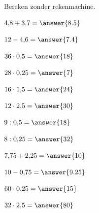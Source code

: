 \documentclass{ximera}
\begin{document}
\begin{oefening}{\oefB\ESS}

Bereken zonder rekenmachine.

\begin{question} \(4{,}8+3{,}7=\answer{8.5}\) \end{question}

\begin{question} \(12-4{,}6=\answer{7.4}\) \end{question}

\begin{question} \(36\cdot0{,}5=\answer{18}\) \end{question}

\begin{question} \(28\cdot0{,}25=\answer{7}\) \end{question}

\begin{question} \(16\cdot1{,}5=\answer{24}\) \end{question}

\begin{question} \(12\cdot2{,}5=\answer{30}\) \end{question}

\begin{question} \(9:0{,}5=\answer{18}\) \end{question}

\begin{question} \(8:0{,}25=\answer{32}\) \end{question}

\begin{question} \(7{,}75+2{,}25=\answer{10}\) \end{question}

\begin{question} \(10-0{,}75=\answer{9.25}\) \end{question}

\begin{question} \(60\cdot0{,}25=\answer{15}\) \end{question}

\begin{question} \(32\cdot2{,}5=\answer{80}\) \end{question}

\end{oefening}


\end{document}
